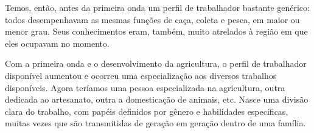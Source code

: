 Temos, então, antes da primeira onda um perfil de trabalhador bastante genérico: todos desempenhavam as mesmas funções de caça, coleta e pesca, em maior ou menor grau. Seus conhecimentos eram, também, muito atrelados à região em que eles ocupavam no momento.

Com a primeira onda e o desenvolvimento da agricultura, o perfil de trabalhador disponível aumentou e ocorreu uma especialização aos diversos trabalhos disponíveis. Agora teríamos uma pessoa especializada na agricultura, outra dedicada ao artesanato, outra a domesticação de animais, etc. Nasce uma divisão clara do trabalho, com papéis definidos por gênero e habilidades específicas, muitas vezes que são transmitidas de geração em geração dentro de uma família.